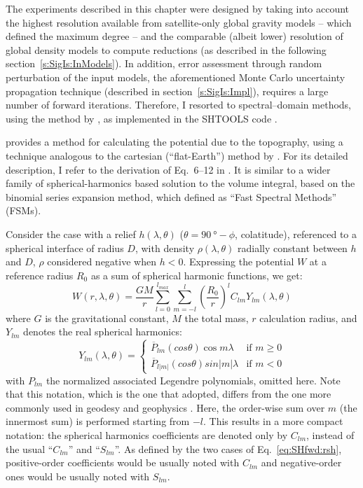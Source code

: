 The experiments described in this chapter were designed by taking into account the highest resolution available from satellite-only global gravity models -- which defined the maximum degree -- and the comparable (albeit lower) resolution of global density models to compute reductions (as described in the following section~\ref{s:SigIs:InModels}).
In addition, error assessment through random perturbation of the input models, the aforementioned Monte Carlo uncertainty propagation technique (described in section~\ref{s:SigIs:Impl}), requires a large number of forward iterations.
Therefore, I resorted to spectral--domain methods, using the method by \textcite{Wieczorek2007}, as implemented in the SHTOOLS code \parencite{Wieczorek2018}.

\Textcite{Wieczorek2007} provides a method for calculating the potential due to the topography, using a technique analogous to the cartesian (``flat-Earth'') method by \textcite{Parker1973}.
For its detailed description, I refer to the derivation of Eq.~6--12 in \textcite{Wieczorek1998}.
It is similar to a wider family of spherical-harmonics based solution to the volume integral, based on the binomial series expansion method, which \textcite{Root2015} defined as ``Fast Spectral Methods'' (FSMs).

Consider the case with a relief $h(\lambda, \theta)$ ($\theta = \SI{90}{\degree} - \phi$, colatitude), referenced to a spherical interface of radius $D$, with density $\rho(\lambda, \theta)$ radially constant between $h$ and $D$, $\rho$ considered negative when $h<0$.
Expressing the potential $W$ at a reference radius $R_0$ as a sum of spherical harmonic functions, we get:
\begin{equation}
    \label{eq:SHfwd:pot}
    W(r, \lambda, \theta) =
    \frac{GM}{r}
    \sum_{l=0}^{l_{max}}
    \sum_{m=-l}^{l}
    \left( \frac{R_0}{r} \right)^l
    C_{lm} Y_{lm} (\lambda, \theta)
\end{equation}
where $G$ is the gravitational constant, $M$ the total mass, $r$ calculation radius, and $Y_{lm}$ denotes the real spherical harmonics:
\begin{equation}
    \label{eq:SHfwd:rsh}
    Y_{lm}(\lambda, \theta) =
    \begin{cases}
        \overline{P}_{lm} (cos \theta) \cos m \lambda & \mbox{if } m \ge 0 \\
        \overline{P}_{l|m|} (cos \theta) sin |m| \lambda & \mbox{if } m < 0
    \end{cases}
\end{equation}
with $P_{lm}$ the normalized associated Legendre polynomials, omitted here.
Note that this notation, which is the one that \textcite{Wieczorek2007} adopted, differs from the one more commonly used in geodesy and geophysics \parencite[e.g.][]{HofmannWellenhof2006}.
Here, the order-wise sum over $m$ (the innermost sum) is performed starting from $-l$.
This results in a more compact notation: the spherical harmonics coefficients are denoted only by $C_{lm}$, instead of the usual ``$C_{lm}$'' and ``$S_{lm}$''.
As defined by the two cases of Eq.~\ref{eq:SHfwd:rsh}, positive-order coefficients would be usually noted with $C_{lm}$ and negative-order ones would be usually noted with $S_{lm}$.

